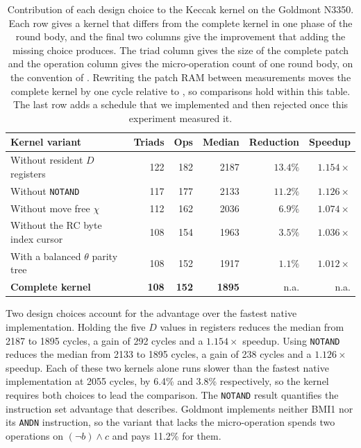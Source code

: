 \documentclass[journal=tches,submission]{iacrtrans}
\newcommand{\code}[1]{\texttt{#1}}
\begin{document}
\begin{table}[!ht]
\centering
\caption{Contribution of each design choice to the Keccak kernel on the Goldmont N3350.
Each row gives a kernel that differs from the complete kernel in one phase of the round body, and the final two columns give the improvement that adding the missing choice produces.
The triad column gives the size of the complete patch and the operation column gives the micro-operation count of one round body, on the convention of .
Rewriting the patch RAM between measurements moves the complete kernel by one cycle relative to , so comparisons hold within this table.
The last row adds a schedule that we implemented and then rejected once this experiment measured it.}
\label{tab:results-ablation}
\footnotesize
\setlength{\tabcolsep}{4pt}
\begin{tabular}{@{}lrrrrr@{}}
\toprule
Kernel variant & Triads & Ops & Median & Reduction & Speedup \\
\midrule
Without resident $D$ registers      & 122 & 182 & 2187 & $13.4\%$ & $1.154\times$ \\
Without \code{NOTAND}               & 117 & 177 & 2133 & $11.2\%$ & $1.126\times$ \\
Without move free $\chi$            & 112 & 162 & 2036 & $6.9\%$  & $1.074\times$ \\
Without the RC byte index cursor    & 108 & 154 & 1963 & $3.5\%$  & $1.036\times$ \\
With a balanced $\theta$ parity tree & 108 & 152 & 1917 & $1.1\%$  & $1.012\times$ \\
\midrule
\textbf{Complete kernel}            & \textbf{108} & \textbf{152} & \textbf{1895} & n.a. & n.a. \\
\bottomrule
\end{tabular}
\end{table}

Two design choices account for the advantage over the fastest native implementation.
Holding the five $D$ values in registers reduces the median from 2187 to 1895 cycles, a gain of 292 cycles and a $1.154\times$ speedup.
Using \code{NOTAND} reduces the median from 2133 to 1895 cycles, a gain of 238 cycles and a $1.126\times$ speedup.
Each of these two kernels alone runs slower than the fastest native implementation at 2055 cycles, by 6.4\% and 3.8\% respectively, so the kernel requires both choices to lead the comparison.
The \code{NOTAND} result quantifies the instruction set advantage that  describes.
Goldmont implements neither BMI1 nor its \code{ANDN} instruction, so the variant that lacks the micro-operation spends two operations on $(\lnot b)\wedge c$ and pays 11.2\% for them.
\end{document}
